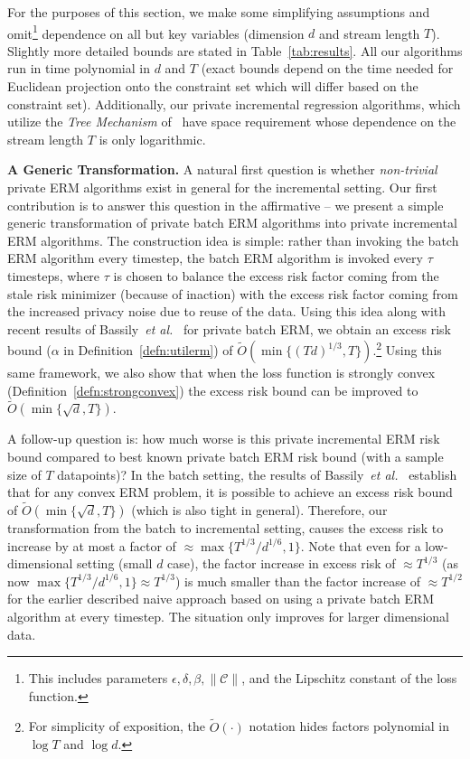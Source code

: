 \documentclass{article}
\theoremstyle{plain}
\def \eps {\epsilon}
\def \CCC {\mathcal{C}}
\begin{document}
For the purposes of this section, we make some simplifying assumptions and omit\footnote{This includes parameters $\eps,\delta, \beta, \|\CCC\|$, and the Lipschitz constant of the loss function.} dependence  on all but key variables (dimension $d$ and stream length $T$). Slightly more detailed bounds are stated in Table~\ref{tab:results}. All our algorithms run in time polynomial in $d$ and $T$ (exact bounds depend on the time needed for Euclidean projection onto the constraint set which will differ based on the constraint set). Additionally, our private incremental regression algorithms, which utilize the \emph{Tree Mechanism} of~\cite{DNPR10,CSS11} have space requirement whose dependence on the stream length $T$ is only logarithmic.

\begin{list}{{\bf ()}}{
\setlength{\leftmargin}{12pt}
\setlength{\listparindent}{\parindent}
\setlength{\parsep}{0pt}}
\item \label{res:con1} \textbf{A Generic Transformation.} A natural first question is whether {\em non-trivial} private ERM algorithms exist in general for the incremental setting. Our first contribution is to answer this question in the affirmative -- we present a simple generic transformation of private batch ERM algorithms into private incremental ERM algorithms. The construction idea is simple: rather than invoking the batch ERM algorithm every timestep, the batch ERM algorithm is invoked every $\tau$ timesteps, where $\tau$ is chosen to balance the excess risk factor coming from the stale risk minimizer (because of inaction) with the excess risk factor coming from the increased privacy noise due to reuse of the data. Using this idea along with recent results of Bassily~\emph{et al.}\ \cite{bassily2014differentially} for private batch ERM, we obtain an excess risk bound ($\alpha$ in Definition~\ref{defn:utilerm}) of $\tilde{O}(\min\{(Td)^{1/3},T\})$.\footnote{For simplicity of exposition, the $\tilde{O}(\cdot)$ notation hides factors polynomial in $\log T$ and $\log d$.} Using this same framework, we also show that when the loss function is strongly convex (Definition~\ref{defn:strongconvex}) the excess risk bound can be improved to $\tilde{O}(\min\{\sqrt{d},T\})$. 

A follow-up question is: how much worse is this private incremental ERM risk bound compared to best known private batch ERM risk bound (with a sample size of $T$ datapoints)? In the batch setting, the results of Bassily~\emph{et al.}\ \cite{bassily2014differentially} establish that for any convex ERM problem, it is possible to achieve an excess risk bound of $\tilde{O}(\min\{\sqrt{d},T\})$ (which is also tight in general). Therefore, our transformation from the batch to incremental setting, causes the excess risk to increase by at most a factor of $\approx \max\{T^{1/3}/d^{1/6},1\}$. Note that even for a low-dimensional setting (small $d$ case), the factor increase in excess risk of $\approx T^{1/3}$  (as now $\max\{T^{1/3}/d^{1/6},1\} \approx T^{1/3}$) is much smaller than the factor increase of $\approx T^{1/2}$ for the earlier described naive approach based on using a private batch ERM algorithm at every timestep. The situation only improves for larger dimensional data.


\end{list}
\end{document}

